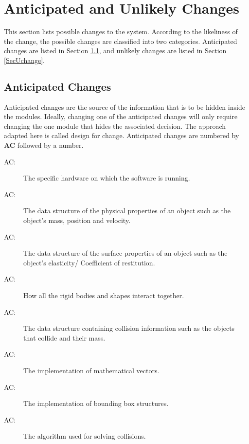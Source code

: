 \documentclass[12pt]{article}
\newcounter{acnum}
\newcommand{\actheacnum}{AC\theacnum}
\begin{document}
\section{Anticipated and Unlikely Changes} \label{SecChange}

This section lists possible changes to the system. According to the likeliness
of the change, the possible changes are classified into two
categories. Anticipated changes are listed in Section \ref{SecAchange}, and
unlikely changes are listed in Section \ref{SecUchange}.

\subsection{Anticipated Changes} \label{SecAchange}

Anticipated changes are the source of the information that is to be hidden
inside the modules. Ideally, changing one of the anticipated changes will only
require changing the one module that hides the associated decision. The approach
adapted here is called design for
change. Anticipated changes are numbered by \textbf{AC} followed by a number.

\begin{description}
\item[ \actheacnum \label{acHardware}:] The specific
  hardware on which the software is running.
\item[ \actheacnum \label{acBody}:] The data structure of the
physical properties of an object such as the object's mass, position and velocity.
\item[ \actheacnum \label{acShape}:] The data structure of the
surface properties of an object such as the object's elasticity/ Coefficient of restitution.
\item[ \actheacnum \label{acSpace}:] How all the rigid
bodies and shapes interact together.
\item[ \actheacnum \label{acCollision}:] The data structure containing collision information such as the objects that collide and their mass. 
\item[ \actheacnum \label{acVector}:] The implementation of mathematical vectors.
\item[ \actheacnum \label{acBBox}:] The implementation of bounding box structures.
\item[ \actheacnum \label{acSolver}:] The algorithm used for solving collisions.

\end{description}
\end{document}
